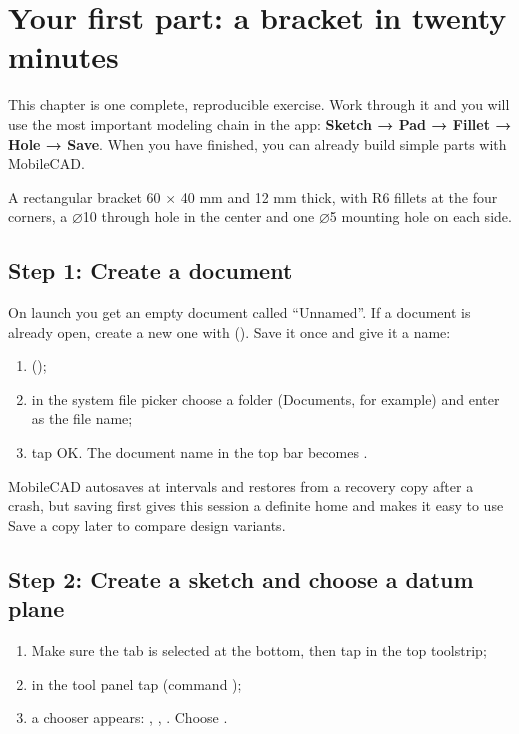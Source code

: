 \chapter{Your first part: a bracket in twenty minutes}

This chapter is one complete, reproducible exercise. Work through it and you will use the most important
modeling chain in the app: \textbf{Sketch → Pad → Fillet → Hole → Save}. When you have finished, you can
already build simple parts with MobileCAD.

\begin{practice}[Goal]
A rectangular bracket 60 × 40 mm and 12 mm thick, with R6 fillets at the four corners, a ⌀10 through hole in
the center and one ⌀5 mounting hole on each side.
\end{practice}

\section{Step 1: Create a document}

On launch you get an empty document called “Unnamed”. If a document is already open, create a new one with
 (). Save it once and give it a name:

\begin{enumerate}
  \item {} ();
  \item in the system file picker choose a folder (Documents, for example) and enter  as the
        file name;
  \item tap OK. The document name in the top bar becomes .
\end{enumerate}

\begin{tip}
MobileCAD autosaves at intervals and restores from a recovery copy after a crash, but saving first gives this
session a definite home and makes it easy to use Save a copy later to compare design variants.
\end{tip}

\section{Step 2: Create a sketch and choose a datum plane}

\begin{enumerate}
  \item Make sure the  tab is selected at the bottom, then tap  in the top toolstrip;
  \item in the tool panel tap  (command );
  \item a  chooser appears: , , . Choose
        .
\end{enumerate}

